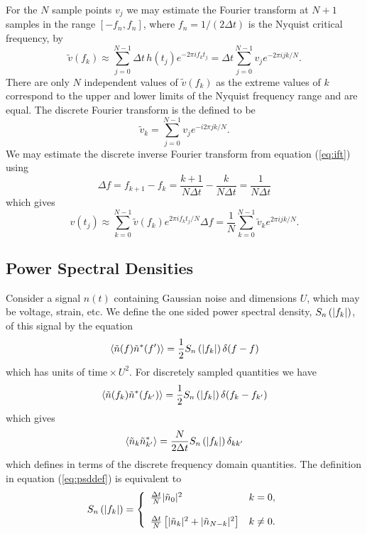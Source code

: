 For the $N$ sample points $v_j$ we may estimate the Fourier transform at 
$N + 1$ samples in the range $[-f_n,f_n]$, where $f_n = 1/(2\Delta t)$ is the
Nyquist critical frequency, by
\begin{equation}
\tilde{v}(f_k) \approx \sum_{j=0}^{N-1} \Delta t\, h(t_j) e^{-2 \pi i f_k t_j}
= \Delta t \sum_{j=0}^{N-1} v_j e^{-2 \pi i j k / N}.
\end{equation}
There are only $N$ independent values of $\tilde{v}(f_k)$ as the extreme
values of $k$ correspond to the upper and lower limits of the Nyquist
frequency range and are equal. The discrete Fourier transform is the defined
to be\cite{T010095}
\begin{equation}
\tilde{v}_k = \sum_{j=0}^{N-1} v_j e^{-i 2 \pi j k / N}.
\end{equation}
We may estimate the discrete inverse Fourier transform from equation
(\ref{eq:ift}) using
\begin{equation}
\Delta f = f_{k+1} - f_k = \frac{k+1}{N\Delta t} - \frac{k}{N\Delta t} =
\frac{1}{N\Delta t}
\end{equation}
which gives
\begin{equation}
v(t_j) \approx \sum_{k=0}^{N-1} \tilde{v}(f_k) e^{2 \pi i f_k t_j / N} \Delta f
= \frac{1}{N} \sum_{k=0}^{N-1} \tilde{v}_k e^{2 \pi i j k / N}.
\end{equation}

\subsection{Power Spectral Densities}
\label{ss:psdconv}

Consider a signal $n(t)$ containing Gaussian noise and dimensions $U$, which
may be voltage, strain, etc. We define the one sided power spectral density,
$S_n\left(\left|f_{k}\right|\right)$, of this signal by the equation
\begin{equation}
\left\langle\tilde{n}(f) \tilde{n}^\ast(f')\right\rangle = 
\frac{1}{2}S_n\left(\left|f_{k}\right|\right)\delta(f-f)
\end{equation}
which has units of $\mathrm{time}\times U^2$. For discretely sampled 
quantities we have
\begin{equation}
\left\langle\tilde{n}(f_k) \tilde{n}^\ast(f_{k'})\right\rangle = 
\frac{1}{2}S_n\left(\left|f_{k}\right|\right)\delta(f_k-f_{k'})
\end{equation}
which gives
\begin{equation}
\label{eq:psddef}
\left\langle\tilde{n}_k \tilde{n}_{k'}^\ast\right\rangle = 
\frac{N}{2\Delta t}S_n\left(\left|f_{k}\right|\right)\delta_{kk'}
\end{equation}
which defines \ospsd in terms of the discrete frequency domain quantities.
The definition in equation (\ref{eq:psddef}) is equivalent to
\begin{equation}
S_n\left(\left|f_{k}\right|\right) = \left\{
\begin{array}{ll}
\frac{\Delta t}{N} | \tilde{n}_0 |^2 & k = 0, \\
\\
\frac{\Delta t}{N} \left[ | \tilde{n}_k |^2 + | \tilde{n}_{N-k} |^2 \right] &
k\neq 0.
\end{array}
\right.
\end{equation}


